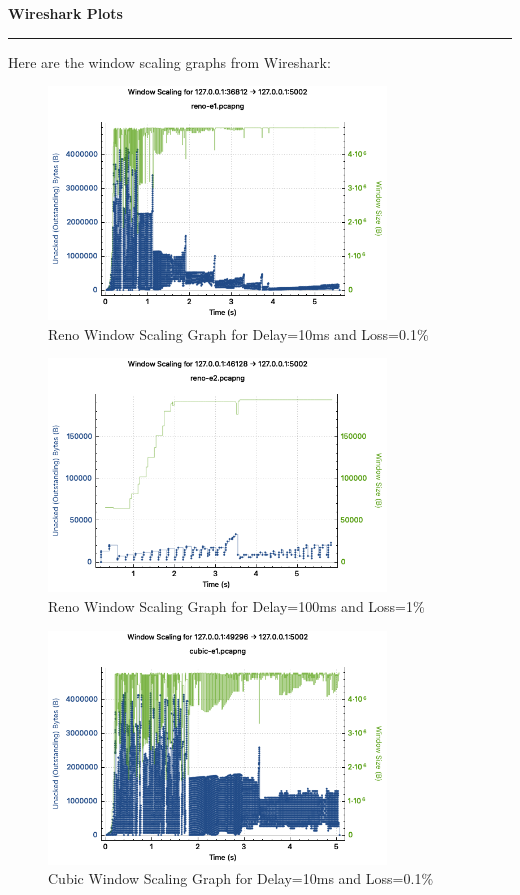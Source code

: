 \documentclass[a4paper,12pt]{article}
\newenvironment{solution}[2][]{%
    \begin{mdframed}[linecolor=blue!70!black, linewidth=2pt, roundcorner=10pt, backgroundcolor=yellow!10!white, skipabove=12pt, skipbelow=12pt]%
        \textbf{\large #2}
        \par\noindent\rule{\textwidth}{0.4pt}
}{
    \end{mdframed}
}
\begin{document}
\clearpage

\begin{solution}{Wireshark Plots}
    Here are the window scaling graphs from Wireshark:
    \begin{figure}[H]
        \centering
        \includegraphics[width=0.8\textwidth]{reno-e1.png}
        \caption{Reno Window Scaling Graph for Delay=10ms and Loss=0.1\%}
    \end{figure}

    \begin{figure}[H]
        \centering
        \includegraphics[width=0.8\textwidth]{reno-e2.png}
        \caption{Reno Window Scaling Graph for Delay=100ms and Loss=1\%}
    \end{figure}

    \begin{figure}[H]
        \centering
        \includegraphics[width=0.8\textwidth]{cubic-e1.png}
        \caption{Cubic Window Scaling Graph for Delay=10ms and Loss=0.1\%}
    \end{figure}


\end{solution}
\end{document}
